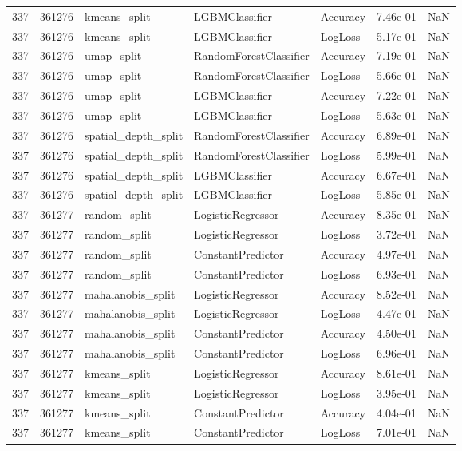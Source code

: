 \begin{tabular}{rrlllrr}
337 & 361276 & kmeans\_split & LGBMClassifier & Accuracy & 7.46e-01 & NaN \\
337 & 361276 & kmeans\_split & LGBMClassifier & LogLoss & 5.17e-01 & NaN \\
337 & 361276 & umap\_split & RandomForestClassifier & Accuracy & 7.19e-01 & NaN \\
337 & 361276 & umap\_split & RandomForestClassifier & LogLoss & 5.66e-01 & NaN \\
337 & 361276 & umap\_split & LGBMClassifier & Accuracy & 7.22e-01 & NaN \\
337 & 361276 & umap\_split & LGBMClassifier & LogLoss & 5.63e-01 & NaN \\
337 & 361276 & spatial\_depth\_split & RandomForestClassifier & Accuracy & 6.89e-01 & NaN \\
337 & 361276 & spatial\_depth\_split & RandomForestClassifier & LogLoss & 5.99e-01 & NaN \\
337 & 361276 & spatial\_depth\_split & LGBMClassifier & Accuracy & 6.67e-01 & NaN \\
337 & 361276 & spatial\_depth\_split & LGBMClassifier & LogLoss & 5.85e-01 & NaN \\
337 & 361277 & random\_split & LogisticRegressor & Accuracy & 8.35e-01 & NaN \\
337 & 361277 & random\_split & LogisticRegressor & LogLoss & 3.72e-01 & NaN \\
337 & 361277 & random\_split & ConstantPredictor & Accuracy & 4.97e-01 & NaN \\
337 & 361277 & random\_split & ConstantPredictor & LogLoss & 6.93e-01 & NaN \\
337 & 361277 & mahalanobis\_split & LogisticRegressor & Accuracy & 8.52e-01 & NaN \\
337 & 361277 & mahalanobis\_split & LogisticRegressor & LogLoss & 4.47e-01 & NaN \\
337 & 361277 & mahalanobis\_split & ConstantPredictor & Accuracy & 4.50e-01 & NaN \\
337 & 361277 & mahalanobis\_split & ConstantPredictor & LogLoss & 6.96e-01 & NaN \\
337 & 361277 & kmeans\_split & LogisticRegressor & Accuracy & 8.61e-01 & NaN \\
337 & 361277 & kmeans\_split & LogisticRegressor & LogLoss & 3.95e-01 & NaN \\
337 & 361277 & kmeans\_split & ConstantPredictor & Accuracy & 4.04e-01 & NaN \\
337 & 361277 & kmeans\_split & ConstantPredictor & LogLoss & 7.01e-01 & NaN \\

\end{tabular}
